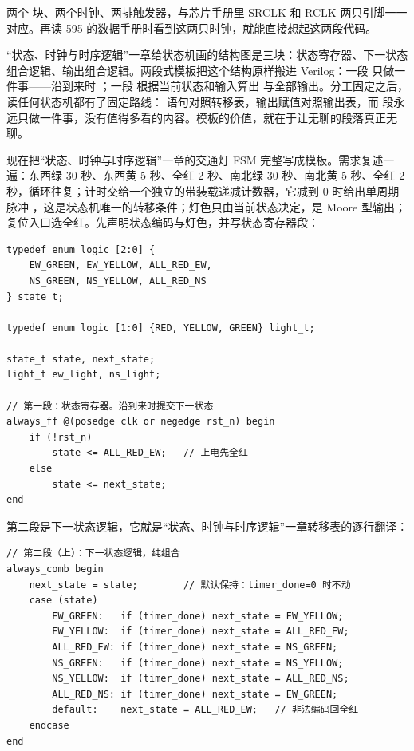 两个  块、两个时钟、两排触发器，与芯片手册里 SRCLK 和 RCLK 两只引脚一一对应。再读 595 的数据手册时看到这两只时钟，就能直接想起这两段代码。


“状态、时钟与时序逻辑”一章给状态机画的结构图是三块：状态寄存器、下一状态组合逻辑、输出组合逻辑。两段式模板把这个结构原样搬进 Verilog：一段  只做一件事——沿到来时 ；一段  根据当前状态和输入算出  与全部输出。分工固定之后，读任何状态机都有了固定路线： 语句对照转移表，输出赋值对照输出表，而  段永远只做一件事，没有值得多看的内容。模板的价值，就在于让无聊的段落真正无聊。

现在把“状态、时钟与时序逻辑”一章的交通灯 FSM 完整写成模板。需求复述一遍：东西绿 30 秒、东西黄 5 秒、全红 2 秒、南北绿 30 秒、南北黄 5 秒、全红 2 秒，循环往复；计时交给一个独立的带装载递减计数器，它减到 0 时给出单周期脉冲 ，这是状态机唯一的转移条件；灯色只由当前状态决定，是 Moore 型输出；复位入口选全红。先声明状态编码与灯色，并写状态寄存器段：

\begin{lstlisting}
typedef enum logic [2:0] {
    EW_GREEN, EW_YELLOW, ALL_RED_EW,
    NS_GREEN, NS_YELLOW, ALL_RED_NS
} state_t;

typedef enum logic [1:0] {RED, YELLOW, GREEN} light_t;

state_t state, next_state;
light_t ew_light, ns_light;

// 第一段：状态寄存器。沿到来时提交下一状态
always_ff @(posedge clk or negedge rst_n) begin
    if (!rst_n)
        state <= ALL_RED_EW;   // 上电先全红
    else
        state <= next_state;
end
\end{lstlisting}

第二段是下一状态逻辑，它就是“状态、时钟与时序逻辑”一章转移表的逐行翻译：

\begin{lstlisting}
// 第二段（上）：下一状态逻辑，纯组合
always_comb begin
    next_state = state;        // 默认保持：timer_done=0 时不动
    case (state)
        EW_GREEN:   if (timer_done) next_state = EW_YELLOW;
        EW_YELLOW:  if (timer_done) next_state = ALL_RED_EW;
        ALL_RED_EW: if (timer_done) next_state = NS_GREEN;
        NS_GREEN:   if (timer_done) next_state = NS_YELLOW;
        NS_YELLOW:  if (timer_done) next_state = ALL_RED_NS;
        ALL_RED_NS: if (timer_done) next_state = EW_GREEN;
        default:    next_state = ALL_RED_EW;   // 非法编码回全红
    endcase
end
\end{lstlisting}

